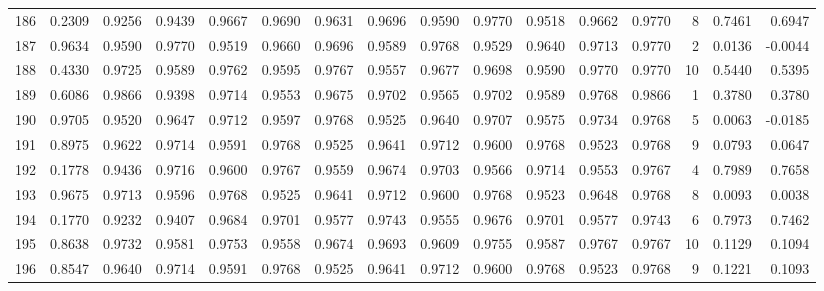 \begin{tabular}{lrrrrrrrrrrrrrrr}
186 &      0.2309 &  0.9256 &  0.9439 &  0.9667 &  0.9690 &  0.9631 &  0.9696 &  0.9590 &  0.9770 &  0.9518 &   0.9662 &     0.9770 &      8 &                    0.7461 &                     0.6947 \\
187 &      0.9634 &  0.9590 &  0.9770 &  0.9519 &  0.9660 &  0.9696 &  0.9589 &  0.9768 &  0.9529 &  0.9640 &   0.9713 &     0.9770 &      2 &                    0.0136 &                    -0.0044 \\
188 &      0.4330 &  0.9725 &  0.9589 &  0.9762 &  0.9595 &  0.9767 &  0.9557 &  0.9677 &  0.9698 &  0.9590 &   0.9770 &     0.9770 &     10 &                    0.5440 &                     0.5395 \\
189 &      0.6086 &  0.9866 &  0.9398 &  0.9714 &  0.9553 &  0.9675 &  0.9702 &  0.9565 &  0.9702 &  0.9589 &   0.9768 &     0.9866 &      1 &                    0.3780 &                     0.3780 \\
190 &      0.9705 &  0.9520 &  0.9647 &  0.9712 &  0.9597 &  0.9768 &  0.9525 &  0.9640 &  0.9707 &  0.9575 &   0.9734 &     0.9768 &      5 &                    0.0063 &                    -0.0185 \\
191 &      0.8975 &  0.9622 &  0.9714 &  0.9591 &  0.9768 &  0.9525 &  0.9641 &  0.9712 &  0.9600 &  0.9768 &   0.9523 &     0.9768 &      9 &                    0.0793 &                     0.0647 \\
192 &      0.1778 &  0.9436 &  0.9716 &  0.9600 &  0.9767 &  0.9559 &  0.9674 &  0.9703 &  0.9566 &  0.9714 &   0.9553 &     0.9767 &      4 &                    0.7989 &                     0.7658 \\
193 &      0.9675 &  0.9713 &  0.9596 &  0.9768 &  0.9525 &  0.9641 &  0.9712 &  0.9600 &  0.9768 &  0.9523 &   0.9648 &     0.9768 &      8 &                    0.0093 &                     0.0038 \\
194 &      0.1770 &  0.9232 &  0.9407 &  0.9684 &  0.9701 &  0.9577 &  0.9743 &  0.9555 &  0.9676 &  0.9701 &   0.9577 &     0.9743 &      6 &                    0.7973 &                     0.7462 \\
195 &      0.8638 &  0.9732 &  0.9581 &  0.9753 &  0.9558 &  0.9674 &  0.9693 &  0.9609 &  0.9755 &  0.9587 &   0.9767 &     0.9767 &     10 &                    0.1129 &                     0.1094 \\
196 &      0.8547 &  0.9640 &  0.9714 &  0.9591 &  0.9768 &  0.9525 &  0.9641 &  0.9712 &  0.9600 &  0.9768 &   0.9523 &     0.9768 &      9 &                    0.1221 &                     0.1093 \\

\end{tabular}
